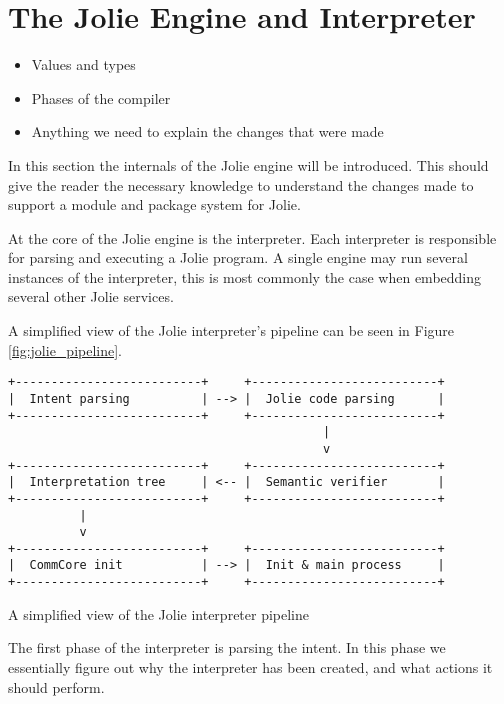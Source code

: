 
\section{The Jolie Engine and Interpreter}

\begin{itemize}
\item Values and types
\item Phases of the compiler
\item Anything we need to explain the changes that were made
\end{itemize}


In this section the internals of the Jolie engine will be introduced. This
should give the reader the necessary knowledge to understand the changes made
to support a module and package system for Jolie.

At the core of the Jolie engine is the interpreter. Each interpreter is
responsible for parsing and executing a Jolie program. A single engine may run
several instances of the interpreter, this is most commonly the case when
embedding several other Jolie services.

A simplified view of the Jolie interpreter's pipeline can be seen in Figure
\ref{fig:jolie_pipeline}.

\begin{listing}[H]
\begin{verbatim}
+--------------------------+     +--------------------------+
|  Intent parsing          | --> |  Jolie code parsing      |
+--------------------------+     +--------------------------+
                                            |
                                            v
+--------------------------+     +--------------------------+
|  Interpretation tree     | <-- |  Semantic verifier       |
+--------------------------+     +--------------------------+
          |
          v
+--------------------------+     +--------------------------+
|  CommCore init           | --> |  Init & main process     |
+--------------------------+     +--------------------------+
\end{verbatim}
\caption{A simplified view of the Jolie interpreter pipeline}
\label{fig:jolie_pipeline}
\end{listing}

The first phase of the interpreter is parsing the intent. In this phase we
essentially figure out why the interpreter has been created, and what actions
it should perform.

